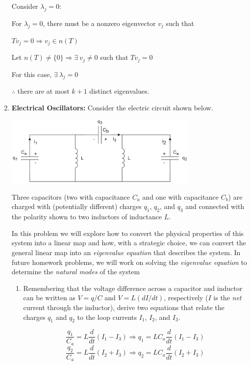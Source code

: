 \documentclass[fleqn]{article}
\begin{document}
\begin{enumerate}[nolistsep]
			\pagebreak
			Consider $\lambda_j = 0$:
			
			For $\lambda_j=0$, there must be a nonzero eigenvector $v_j$ such that
			
			$Tv_j = 0 \Rightarrow v_j \in n(T)$
			
			Let $n(T) \neq \{0\} \Rightarrow \exists\ v_j \neq 0$ such that $Tv_j = 0$
			
			For this case, $\exists\ \lambda_j = 0$
			
			$\therefore$ there are at most $k + 1$ distinct eigenvalues.
		
		\item \textbf{Electrical Oscillators:} Consider the electric circuit shown below.
		
			{\centering
				\includegraphics[width=0.75\textwidth]{Homework4_Circuit_Sowatzke.png}
			\par}
			
			Three capacitors (two with capacitance $C_a$ and one with capacitance $C_b$) are charged with (potentially different) charges $q_1$, $q_2$, and $q_3$ and connected with the polarity shown to two inductors of inductance $L$.
			
			In this problem we will explore how to convert the physical properties of this system into a linear map and how, with a strategic choice, we can convert the general linear map into an \textit{eigenvalue equation} that describes the system. In future homework problems, we will work on solving the \textit{eigenvalue equation} to determine the \textit{natural modes} of the system
			
			\begin{enumerate}[nolistsep]
				\item Remembering that the voltage difference across a capacitor and inductor can be written as $V=q/C$ and $V=L(dI/dt)$, respectively ($I$ is the \textit{net} current through the inductor), derive two equations that relate the charges $q_1$ and $q_2$ to the loop currents $I_1$, $I_2$, and $I_3$.
				
					\pagebreak
					\begin{equation*}
						\frac{q_1}{C_a} = L\frac{d}{dt}(I_1 - I_3)\Rightarrow q_1 = LC_a\frac{d}{dt}(I_1 - I_3)
					\end{equation*}
					\begin{equation*}
						\frac{q_2}{C_a} = L\frac{d}{dt}(I_2 + I_3) \Rightarrow q_2 = LC_a\frac{d}{dt}(I_2 + I_3)
					\end{equation*}
				

\end{enumerate}
\end{enumerate}
\end{document}

